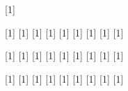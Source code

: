[1]{} %


%
%
\DeclareMathOperator*{\@macros@distribution@normal@name}{\textrm{N}}
\DeclareMathOperator*{\@macros@distribution@uniform@name}{\textrm{Unif}}
\DeclareMathOperator*{\@macros@distribution@exponential@name}{\textrm{Expo}}
\DeclareMathOperator*{\@macros@distribution@gamma@name}{\textrm{Gamma}}
\DeclareMathOperator*{\@macros@distribution@beta@name}{\textrm{Beta}}
\DeclareMathOperator*{\@macros@distribution@chisquare@name}{\chi^2}
\DeclareMathOperator*{\@macros@distribution@student@name}{\textrm{Stu}}
\DeclareMathOperator*{\@macros@distribution@weibull@name}{\textrm{Wbl}}
\DeclareMathOperator*{\@macros@distribution@multinomial@name}{\textrm{Mult}}

[1]{} %
[1]{} %
[1]{} %
[1]{} %
[1]{} %
[1]{} %
[1]{} %
[1]{} %
[1]{} %

[1]{} %
[1]{} %
[1]{} %
[1]{} %
[1]{} %
[1]{} %
[1]{} %
[1]{} %
[1]{} %

[1]{} %
[1]{} %
[1]{} %
[1]{} %
[1]{} %
[1]{} %
[1]{} %
[1]{} %
[1]{} %

